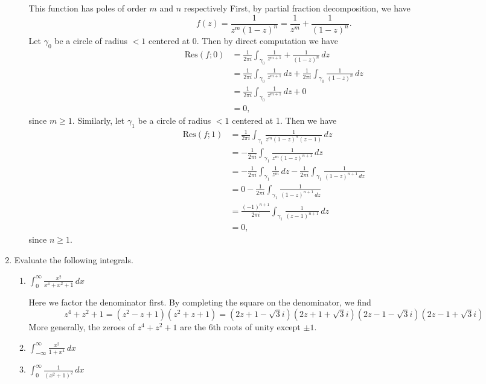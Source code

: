 \documentclass[11pt,oneside,english]{amsart}
\theoremstyle{definition}
\newcommand{\Res}{\text{Res}}
\begin{document}
\begin{enumerate}[leftmargin=*]
\begin{enumerate}
This function has poles of order $m$ and $n$ respectively First, by partial fraction decomposition, we have
\[
f(z)= \frac{1}{z^m(1-z)^n}=\frac{1}{z^m}+\frac{1}{(1-z)^n}.
\]
Let $\gamma_0$ be a circle of radius $<1$ centered at 0. Then by direct computation we have
\begin{align*}
\Res(f;0)&=\frac{1}{2\pi i}\int_{\gamma_0}\frac{1}{z^{m+1}}+\frac{1}{(1-z)^n}\,dz\\[2mm]
&=\frac{1}{2\pi i}\int_{\gamma_0}\frac{1}{z^{m+1}}\,dz+\frac{1}{2\pi i}\int_{\gamma_0}\frac{1}{(1-z)^n}\,dz\\[2mm]
&=\frac{1}{2\pi i}\int_{\gamma_0}\frac{1}{z^{m+1}}\,dz+0\\[2mm]
&=0,
\end{align*}
since $m\geq 1$. Similarly, let $\gamma_1$ be a circle of radius $<1$ centered at 1. Then we have
\begin{align*}
\Res(f;1)&=\frac{1}{2\pi i}\int_{\gamma_1} \frac{1}{z^m(1-z)^n(z-1)}\,dz\\[2mm]
&=-\frac{1}{2\pi i}\int_{\gamma_1} \frac{1}{z^m(1-z)^{n+1}}\,dz\\[2mm]
&=-\frac{1}{2\pi i}\int_{\gamma_1}\frac{1}{z^m}\,dz-\frac{1}{2\pi i }\int_{\gamma_1}\frac{1}{(1-z)^{n+1}\,dz}\\[2mm]
&=0-\frac{1}{2\pi i }\int_{\gamma_1}\frac{1}{(1-z)^{n+1}\,dz}\\[2mm]
&=\frac{(-1)^{n+1}}{2\pi i}\int_{\gamma_1}\frac{1}{(z-1)^{n+1}}\,dz\\[2mm]
&=0,
\end{align*}
since $n\geq1$. 
\end{enumerate}

\item Evaluate the following integrals.

\begin{enumerate}
\itemsep5mm
\item $\displaystyle \int_0^\infty \frac{x^2}{x^4+x^2+1}\,dx$

Here we factor the denominator first. By completing the square on the denominator, we find 
\[
z^4+z^2+1=(z^2-z+1)(z^2+z+1)=(2z+1-\sqrt{3}i)(2z+1+\sqrt{3}i)(2z-1-\sqrt{3}i)(2z-1+\sqrt{3}i)
\]
More generally, the zeroes of $z^4+z^2+1$ are the 6th roots of unity except $\pm1$.




\item $\displaystyle \int_{-\infty}^\infty\frac{x^2}{1+x^4}\,dx$
\item $\displaystyle \int_0^\infty \frac{1}{(x^2+1)^2}\,dx$
\end{enumerate}



\end{enumerate}
\end{document}
